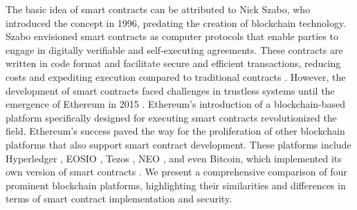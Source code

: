 \documentclass[manuscript,screen]{acmart}
\begin{document}
The basic idea of smart contracts can be attributed to Nick Szabo, who introduced the concept in 1996, predating the creation of blockchain technology. Szabo envisioned smart contracts as computer protocols that enable parties to engage in digitally verifiable and self-executing agreements. These contracts are written in code format and facilitate secure and efficient transactions, reducing costs and expediting execution compared to traditional contracts \cite{Szabo2018SmartC}. However, the development of smart contracts faced challenges in trustless systems until the emergence of Ethereum in 2015 \cite{KhanLGBB21}. Ethereum's introduction of a blockchain-based platform specifically designed for executing smart contracts revolutionized the field. Ethereum's success paved the way for the proliferation of other blockchain platforms that also support smart contract development. These platforms include Hyperledger \cite{Saad2020}, EOSIO \cite{HeZ00L0YJ21}, Tezos \cite{BernardoCCJPT20}, NEO \cite{NguyenDT19}, and even Bitcoin, which implemented its own version of smart contracts \cite{BartolettiZ19}. We present a comprehensive comparison of four prominent blockchain platforms, highlighting their similarities and differences in terms of smart contract implementation and security. 
\end{document}
